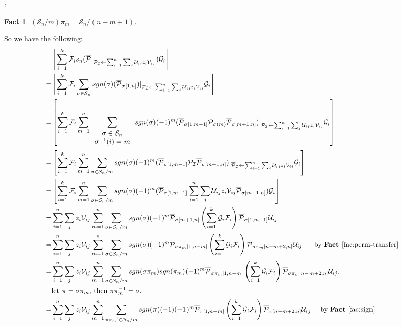 \documentclass[12pt,reqno]{article}
\newtheorem{fact}[theorem]{Fact}
\newenvironment{proof}{\QuadSpace\par\noindent{\bf Proof}:}{\EndProof\HalfSpace}
\newcommand{\QuadSpace}{\vspace{0.25\baselineskip}}
\newcommand{\HalfSpace}{\vspace{0.5\baselineskip}}
\newcommand{\EndProof}{ \hfill \vrule width 1ex height 1ex depth 0pt }
\renewcommand{\t}[1]{\overline{#1}}
\newcommand{\anbra}[1]{\ensuremath{\left[ #1\right]}}
\newcommand{\s}{\sigma}
\renewcommand{\S}{\mathcal{S}}
\newcommand\ii{{\cal I}}
\newcommand{\U}{\mathcal U_{ij}}
\newcommand{\V}{\mathcal V_{ij}}
\newcommand{\uzv}{\sum_{i=1}^n\sum_{j}\U z_i\V}
\begin{document}
\begin{proof}
\begin{fact}\label{fac:set-transfer}
  $(\S_n/m)\pi_m= \S_n/(n-m+1)$.
\end{fact}
So we have the following:
\begin{align*}
&\anbra{\sum_{i=1}^k\mathcal {F}_i  s_{n}(\t{\mathcal P}|_{\mathcal P _\ii\leftarrow \uzv})\mathcal {G}_i }\\
=&\anbra{\sum_{i=1}^k \mathcal {F}_i   \sum_{\s \in \S_{n} }sgn(\s)(\t{\mathcal P}_{\s[1,n]})|_{ \mathcal P _\ii\leftarrow \uzv} \mathcal {G}_i }\\
=&\anbra{\sum_{i=1}^k \mathcal {F}_i  \sum_{m=1}^{n} \sum_{\begin{array}{c}
\s \in \S_{n} \\
\s^{-1}(i)=m
\end{array}}sgn(\sigma)(-1)^m(\t{\mathcal P}_{\s[1,m-1]}\mathcal P_{\s(m)} \t{\mathcal P}_{\s[m+1,n]})|_{\mathcal P _\ii\leftarrow \uzv}\mathcal {G}_i } \\
=&\anbra{\sum_{i=1}^k \mathcal {F}_i  \sum_{m=1}^{n} \sum_{\s\in \S_{n}/m} sgn(\s)(-1)^m(\t{\mathcal P}_{\s[1,m-1]} \mathcal P _\ii \t{\mathcal P}_{\s[m+1,n]})|_{\overline{ \mathcal P }_\ii\leftarrow \uzv}\mathcal {G}_i } \\
=&\anbra{\sum_{i=1}^k \mathcal {F}_i  \sum_{m=1}^{n} \sum_{\s\in \S_{n}/m}sgn(\s)(-1)^m(\t{\mathcal P}_{\s[1,m-1]}\uzv \t{\mathcal P}_{\s[m+1,n]})\mathcal {G}_i } \\
=& \sum_{i=1}^n\sum_j z_i \V\sum_{m=1}^{n} \sum_{\s\in \S_{n}/m}sgn(\s)(-1)^m \t{\mathcal P}_{\s[m+1,n]}\left(\sum_{i=1}^k\mathcal {G}_i \mathcal {F}_i\right) \t{\mathcal P}_{\s[1,m-1]} \U\\
=& \sum_{i=1}^n \sum_j z_i \V\sum_{m=1}^{n} \sum_{\s\in \S_{n}/m}sgn(\s)(-1)^m \t{\mathcal P}_{\s\pi_m[1,n-m]}\left(\sum_{i=1}^k\mathcal {G}_i \mathcal {F}_i\right) \t{\mathcal P}_{\s\pi_m[n-m+2,n]} \U~~~~~\text{by \textbf{Fact} \ref{fac:perm-transfer}}\\
=& \sum_{i=1}^n \sum_j z_i \V\sum_{m=1}^{n} \sum_{\s\in \S_{n}/m}sgn(\s\pi_m)sgn(\pi_m)(-1)^m \t{\mathcal P}_{\s\pi_m[1,n-m]}\left(\sum_{i=1}^k\mathcal {G}_i \mathcal {F}_i\right) \t{\mathcal P}_{\s\pi_m[n-m+2,n]} \U.\\
&\text{let $\pi=\s\pi_m$, then $\pi\pi_m^{-1}=\s$,}\\
=& \sum_{i=1}^n \sum_j z_i \V\sum_{m=1}^{n} \sum_{\pi\pi_m^{-1}\in \S_{n}/m}sgn(\pi)(-1)(-1)^m \t{\mathcal P}_{\pi[1,n-m]}\left(\sum_{i=1}^k\mathcal {G}_i \mathcal {F}_i\right) \t{\mathcal P}_{\pi[n-m+2,n]} \U~~~~\text{by \textbf{Fact} \ref{fac:sign}}\\

\end{align*}
\end{proof}
\end{document}
